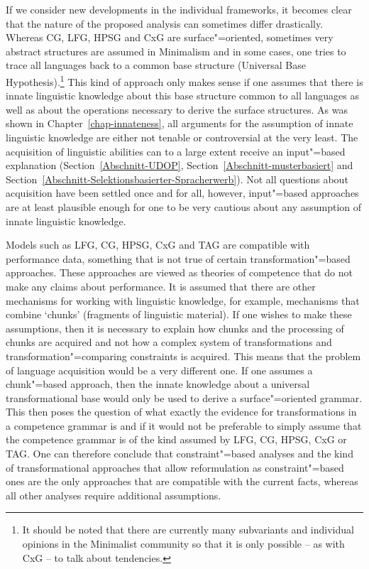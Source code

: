 If we consider new developments in the individual frameworks, it becomes clear that the nature of the proposed analysis can sometimes differ drastically.
Whereas CG, LFG, HPSG and CxG are surface"=oriented, sometimes very abstract structures are assumed in Minimalism and in some cases, one tries to trace all languages back
to a common base structure (Universal Base Hypothesis).\footnote{
  It should be noted that there are currently many subvariants and individual opinions in the Minimalist community so that it
  is only possible -- as with CxG -- to talk about tendencies.%
} This kind of approach only makes sense if one assumes that there is innate linguistic knowledge about this base structure
common to all languages as well as about the operations necessary to derive the surface structures.
As was shown in Chapter~\ref{chap-innateness}, all arguments for the assumption of innate linguistic knowledge are either not tenable
or controversial at the very least.
The acquisition of linguistic abilities can to a large extent receive an input"=based explanation
(Section~\ref{Abschnitt-UDOP}, Section~\ref{Abschnitt-musterbasiert} and
Section~\ref{Abschnitt-Selektionsbasierter-Spracherwerb}). Not all questions about acquisition have been settled once and for all, however, input"=based approaches
are at least plausible enough for one to be very cautious about any assumption of innate linguistic knowledge.

Models such as LFG, CG, HPSG, CxG and TAG are compatible with performance data, something that is not true of certain transformation"=based approaches.
These approaches are viewed as theories of competence that do not make any claims about performance. It is assumed that there are other mechanisms
for working with linguistic knowledge, for example, mechanisms that combine `chunks' (fragments of linguistic material). If one wishes to make these assumptions,
then it is necessary to explain how chunks and the processing of chunks are acquired and not how a complex system of transformations and transformation"=comparing
constraints is acquired. This means that the problem of language acquisition would be a very different one. If one assumes a chunk"=based approach, then the innate
knowledge about a universal transformational base would only be used to derive a surface"=oriented grammar. This then poses the question of what exactly the evidence
for transformations in a competence grammar is and if it would not be preferable to simply assume that the competence grammar is of the kind assumed by LFG, CG, HPSG,
CxG or TAG. One can therefore conclude that constraint"=based analyses and the kind of transformational approaches that allow reformulation as constraint"=based ones
are the only approaches that are compatible with the current facts, whereas all other analyses require additional assumptions.

